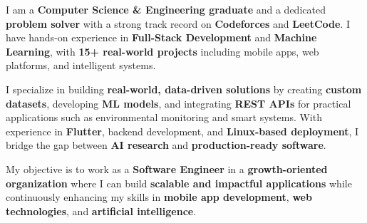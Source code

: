 I am a \textbf{Computer Science \& Engineering graduate} and a dedicated \textbf{problem solver} with a strong track record on \textbf{Codeforces} and \textbf{LeetCode}. I have hands-on experience in \textbf{Full-Stack Development} and \textbf{Machine Learning}, with \textbf{15+ real-world projects} including mobile apps, web platforms, and intelligent systems.

I specialize in building \textbf{real-world, data-driven solutions} by creating \textbf{custom datasets}, developing \textbf{ML models}, and integrating \textbf{REST APIs} for practical applications such as environmental monitoring and smart systems. With experience in \textbf{Flutter}, backend development, and \textbf{Linux-based deployment}, I bridge the gap between \textbf{AI research} and \textbf{production-ready software}.

My objective is to work as a \textbf{Software Engineer} in a \textbf{growth-oriented organization} where I can build \textbf{scalable and impactful applications} while continuously enhancing my skills in \textbf{mobile app development}, \textbf{web technologies}, and \textbf{artificial intelligence}.
